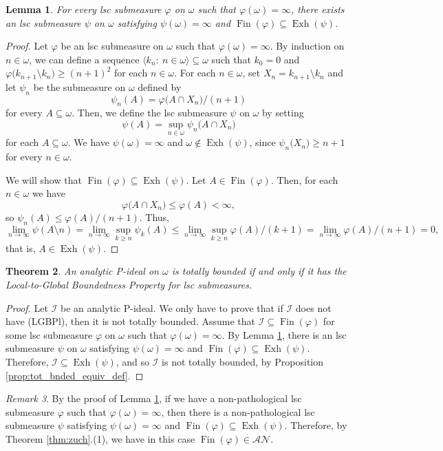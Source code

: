 \documentclass[a4paper,11pt,fleqn]{amsart}
\newtheorem{theorem}{Theorem}[section]
\newtheorem{lemma}[theorem]{Lemma}
\theoremstyle{definition}
\theoremstyle{remark}
\newtheorem{remark}[theorem]{Remark}
\numberwithin{equation}{section}
\newcommand{\N}{\mathbb{N}}
\newcommand{\aA}{\mathcal{A}}
\newcommand{\iI}{\mathcal{I}}
\newcommand{\nN}{\mathcal{N}}
\DeclareMathOperator{\exh}{Exh}
\DeclareMathOperator{\fin}{Fin}
\newcommand{\sub}{\subseteq}
\newcommand{\seqn}[1]{\big\langle#1\colon\ n\io\big\rangle}
\newcommand{\io}{\in\omega}%
\begin{document}
\begin{lemma}\label{lemma:fin_exh}
For every lsc submeasure $\varphi$ on $\omega$ such that $\varphi(\omega)=\infty$, there exists an lsc submeasure $\psi$ on $\omega$ satisfying $\psi(\omega)=\infty$ and $\fin(\varphi)\sub\exh(\psi)$.
\end{lemma}
\begin{proof}
Let $\varphi$ be an lsc submeasure on $\omega$ such that $\varphi(\omega)=\infty$. By induction on $n\io$, we can define a sequence $\seqn{k_n}\sub\omega$ such that $k_0 = 0$ and $\varphi\big(k_{n+1}\setminus k_n\big) \geq (n+1)^2 $ for each $n\io$.
For each $n\io$, set
$X_n = k_{n+1}\setminus k_n$ and let $\psi_n$ be the submeasure on $\omega$ defined by
\[\psi_n(A) = \varphi\big(A\cap X_n\big)/(n+1)\]
for every $A\sub\omega$. Then, we define the lsc submeasure $\psi$ on $\omega$ by setting
\[\psi(A) = \sup_{n\io} \psi_n\big(A \cap X_n\big) \]
for each $A\sub\omega$. We have $\psi(\omega)=\infty$ and $\omega\not\in\exh(\psi)$, since $\psi_n\big(X_n\big)\geq n+1$ for every $n\io$.

We will show that $\fin(\varphi)\sub\exh(\psi)$. Let $A\in\fin(\varphi)$. Then, for each $n\io$ we have
\[\varphi\big(A\cap X_n\big)\leq \varphi(A)<\infty,\]
so $\psi_n(A)\leq \varphi(A)/(n+1)$. Thus,
\[\lim_{n\to\infty} \psi(A \setminus n) = \lim_{n\to\infty}\sup_{k\ge n}\psi_k(A)\le\lim_{n\to\infty}\sup_{k\ge n}\varphi(A)/(k+1)=\lim_{n\to\infty}\varphi(A)/(n+1)=0,\]
that is, $A\in\exh(\psi)$.
\end{proof}

\begin{theorem}\label{thm:tot_bounded_lgbps}
An analytic P-ideal on $\omega$ is totally bounded if and only if it has the Local-to-Global Boundedness Property for lsc submeasures.
\end{theorem}
\begin{proof}
Let $\iI$ be an analytic P-ideal. We only have to prove that if $\iI$ does not have (LGBPl), then it is not totally bounded. Assume that $\iI\sub\fin(\varphi)$ for some lsc submeasure $\varphi$ on $\omega$ such that $\varphi(\omega)=\infty$. By Lemma \ref{lemma:fin_exh}, there is an lsc submeasure $\psi$ on $\omega$ satisfying $\psi(\omega)=\infty$ and $\fin(\varphi)\sub\exh(\psi)$. Therefore, $\iI\sub\exh(\psi)$, and so $\iI$ is not totally bounded, by Proposition \ref{prop:tot_bnded_equiv_def}.
\end{proof}

\begin{remark}
By the proof of Lemma \ref{lemma:fin_exh}, if we have a non-pathological lsc submeasure $\varphi$ such that $\varphi(\omega)=\infty$, then there is a non-pathological lsc submeasure $\psi$ satisfying $\psi(\omega)=\infty$ and $\fin(\varphi)\sub\exh(\psi)$. Therefore, by Theorem \ref{thm:zuch}.(1), we have in this case $\fin(\varphi)\in\aA\nN$.
\end{remark}
\end{document}
